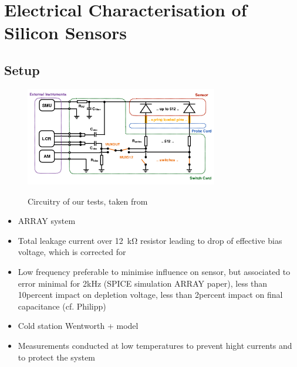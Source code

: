 \section{Electrical Characterisation of Silicon Sensors}
\label{sec:setup}

\subsection{Setup}
\label{subsec:setup_principle}
\begin{figure}[h]
	\centering
	\includegraphics[width=0.75\textwidth]{figures/circuit_cards_updated.png}
	\label{fig:switchprobecard_CAD}
	\caption{
		Circuitry of our tests, taken from~\cite{pitters:array2019}
	}
\end{figure}


\begin{itemize}
	\item ARRAY system~\cite{pitters:array2019}
	\item Total leakage current over \SI{12}{\kilo\ohm} resistor leading to drop of effective bias voltage, which is corrected for
	\item Low frequency preferable to minimise influence on sensor, but associated to error minimal for 2kHz (SPICE simulation ARRAY paper), less than 10percent impact on depletion voltage, less than 2percent impact on final capacitance (cf. Philipp)
\end{itemize}

\begin{itemize}
	\item Cold station Wentworth + model
	\item Measurements conducted at low temperatures to prevent hight currents and to protect the system
\end{itemize}




